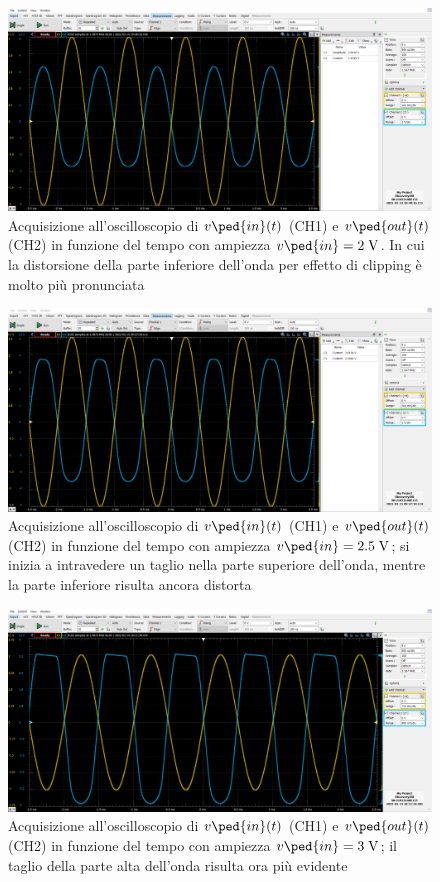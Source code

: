 \documentclass[10pt, a4paper, italian]{article}
\begin{document}
\begin{figure}[htbp]
    \centering
	\includegraphics[width=\textwidth]{amp.2000}
    \caption{Acquisizione all'oscilloscopio di $v\ped{in} (t)$ (CH1) e
    $v\ped{out} (t)$ (CH2) in funzione del tempo con ampiezza
    $v\ped{in} = 2 \; \si{\V}$. In cui la distorsione della parte inferiore
    dell'onda per effetto di clipping è molto più pronunciata}
\end{figure}
\begin{figure}[htbp]
    \centering
	\includegraphics[width=\textwidth]{amp.2500}
    \caption{Acquisizione all'oscilloscopio di $v\ped{in} (t)$ (CH1) e
    $v\ped{out} (t)$ (CH2) in funzione del tempo con ampiezza
    $v\ped{in}=2.5 \; \si{\V}$; si inizia a intravedere un taglio nella parte
    superiore dell'onda, mentre la parte inferiore risulta ancora distorta}
\end{figure}
\begin{figure}[htbp]
    \centering
	\includegraphics[width=\textwidth]{amp.3000}
    \caption{Acquisizione all'oscilloscopio di $v\ped{in} (t)$ (CH1) e
    $v\ped{out} (t)$ (CH2) in funzione del tempo con ampiezza
    $v\ped{in} = 3 \; \si{\V}$; il taglio della parte alta dell'onda risulta
    ora più evidente}
\end{figure}
\end{document}

